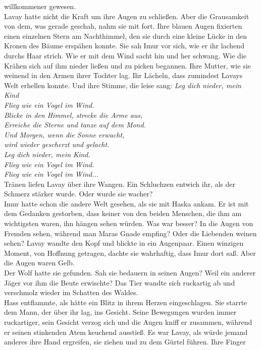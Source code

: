 willkommener gewesen.\\
Lavay hatte nicht die Kraft um ihre Augen zu schließen. Aber die Grausamkeit von dem, was gerade 
geschah, nahm sie mit fort. Ihre blauen Augen fixierten einen einzelnen Stern am Nachthimmel, den 
sie durch eine kleine Lücke in den Kronen des Bäume erspähen konnte. Sie sah Imur vor sich, wie er 
ihr lachend durchs Haar strich. Wie er mit dem Wind sacht hin und her schwang. Wie die Krähen 
sich auf ihm nieder ließen und zu picken begannen. Ihre Mutter, wie sie weinend in den Armen ihrer 
Tochter lag. Ihr Lächeln, dass zumindest Lavays Welt erhellen konnte. Und ihre Stimme, die leise 
sang: \textit{Leg dich nieder, mein Kind\\
Flieg wie ein Vogel im Wind.\\
Blicke in den Himmel, strecke die Arme aus,\\
Erreiche die Sterne und tanze auf dem Mond.\\
Und Morgen, wenn die Sonne erwacht,\\
wird wieder gescherzt und gelacht.\\ 
Leg dich nieder, mein Kind.\\
Flieg wie ein Vogel im Wind.\\
Flieg wie ein Vogel im Wind...}\\
Tränen liefen Lavay über ihre Wangen. Ein Schluchzen entwich ihr, als der Schmerz stärker wurde. 
Oder wurde sie wacher? \\
Imur hatte schon die andere Welt gesehen, als sie mit Haska ankam. Er ist mit dem Gedanken 
gestorben, dass keiner von den beiden Menschen, die ihm am wichtigsten waren, ihn hängen sehen 
würden. Was war besser? In die Augen von Fremden sehen, während man Maras Gnade empfing? Oder die 
Liebenden weinen sehen? Lavay wandte den Kopf und blickte in ein Augenpaar. Einen winzigen Moment, 
von Hoffnung getragen, dachte sie wahrhaftig, dass Imur dort saß. Aber die Augen waren Gelb.\\
Der Wolf hatte sie gefunden. Sah sie bedauern in seinen Augen? Weil ein anderer Jäger vor ihm die 
Beute erwischte? Das Tier wandte sich ruckartig ab und verschmolz wieder im Schatten des Waldes.\\
Hass entflammte, als hätte ein Blitz in ihrem Herzen eingeschlagen. Sie starrte dem Mann, 
der über ihr lag, ins Gesicht. Seine Bewegungen wurden immer ruckartiger, sein Gesicht verzog sich 
und die Augen kniff er zusammen, während er seinen stinkenden Atem keuchend ausstieß. Es war Lavay, 
als würde jemand anderes ihre Hand ergreifen, sie ziehen und zu dem Gürtel führen. Ihre Finger 
